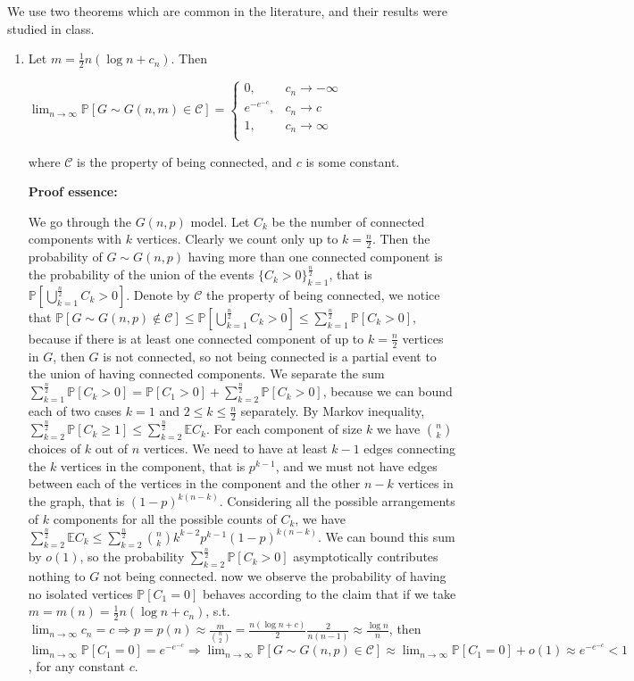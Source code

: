 \documentclass{article}
\begin{document}
We use two theorems which are common in the literature, and their results were studied in class.
\begin{enumerate}
    \item Let $m=\frac{1}{2}n(\log{n}+c_n)$. Then

    $\lim_{n\rightarrow\infty}\mathbb{P}[G\sim{G(n,m)}\in\mathcal{C}]=\begin{cases}
        0, & c_n\rightarrow{-\infty} \\
        e^{-e^{-c}}, & c_n\rightarrow{c} \\
        1, & c_n\rightarrow\infty \\
    \end{cases}$

    where $\mathcal{C}$ is the property of being connected, and $c$ is some constant.

    \textbf{Proof essence:}

    We go through the $G(n,p)$ model.
Let $C_k$ be the number of connected components with $k$ vertices. Clearly we count only up to $k=\frac{n}{2}$. Then the probability of $G\sim{G(n,p)}$ having more than one connected component is the probability of the union of the events $\{C_k>0\}_{k=1}^\frac{n}{2}$, that is $\mathbb{P}[\bigcup_{k=1}^\frac{n}{2}C_k>0]$. Denote by $\mathcal{C}$ the property of being connected, we notice that $\mathbb{P}[G\sim{G(n,p)}\notin\mathcal{C}]\leq\mathbb{P}[\bigcup_{k=1}^\frac{n}{2}C_k>0]\leq\sum_{k=1}^\frac{n}{2}\mathbb{P}[C_k>0]$, because if there is at least one connected component of up to $k=\frac{n}{2}$ vertices in $G$, then $G$ is not connected, so not being connected is a partial event to the union of having connected components. We separate the sum $\sum_{k=1}^\frac{n}{2}\mathbb{P}[C_k>0]=\mathbb{P}[C_1>0]+\sum_{k=2}^\frac{n}{2}\mathbb{P}[C_k>0]$, because we can bound each of two cases $k=1$ and $2\leq{k}\leq\frac{n}{2}$ separately. By Markov inequality, $\sum_{k=2}^\frac{n}{2}\mathbb{P}[C_k\geq{1}]\leq\sum_{k=2}^\frac{n}{2}\mathbb{E}C_k$. For each component of size $k$ we have $\binom{n}{k}$ choices of $k$ out of $n$ vertices. We need to have at least $k-1$ edges connecting the $k$ vertices in the component, that is $p^{k-1}$, and we must not have edges between each of the vertices in the component and the other $n-k$ vertices in the graph, that is $(1-p)^{k(n-k)}$. Considering all the possible arrangements of $k$ components for all the possible counts of $C_k$, we have $\sum_{k=2}^\frac{n}{2}\mathbb{E}C_k\leq\sum_{k=2}^\frac{n}{2}\binom{n}{k}k^{k-2}p^{k-1}(1-p)^{k(n-k)}$. We can bound this sum by $o(1)$, so the probability $\sum_{k=2}^\frac{n}{2}\mathbb{P}[C_k>0]$ asymptotically contributes nothing to $G$ not being connected. now we observe the probability of having no isolated vertices $\mathbb{P}[C_1=0]$ behaves according to the claim that if we take $m=m(n)=\frac{1}{2}n(\log{n}+c_n)$, s.t. $\lim_{n\rightarrow\infty}c_n=c\Rightarrow{p=p(n)\approx\frac{m}{\binom{n}{2}}=\frac{n(\log{n}+c)}{2}\frac{2}{n(n-1)}\approx\frac{\log{n}}{n}}$, then $\lim_{n\rightarrow\infty}\mathbb{P}[C_1=0]=e^{-e^{-c}}\Rightarrow\lim_{n\rightarrow\infty}\mathbb{P}[G\sim{G(n,p)}\in\mathcal{C}]\approx\lim_{n\rightarrow\infty}\mathbb{P}[C_1=0]+o(1)\approx{e^{-e^{-c}}}<1$, for any constant $c$.


\end{enumerate}
\end{document}
